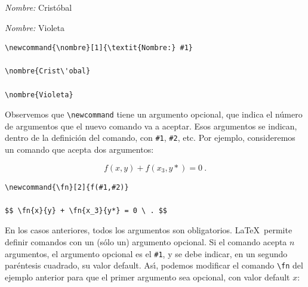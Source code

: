 {\vspace{.3cm}
{\small
\begin{minipage}[t]{5cm}
\newcommand{\nombre}[1]{\textit{Nombre:} #1}
\nombre{Crist\'obal}

\nombre{Violeta}
\end{minipage}
\hspace{1.5cm}
\begin{minipage}[t]{5cm}
\begin{verbatim}
\newcommand{\nombre}[1]{\textit{Nombre:} #1}

\nombre{Crist\'obal}

\nombre{Violeta}
\end{verbatim}
\end{minipage}
}
\vspace{.3cm}

Observemos que \verb+\newcommand+ tiene un argumento opcional, que
indica el n\'umero de argumentos que el nuevo comando va a
aceptar. Esos argumentos se indican, dentro de la definici\'on del
comando, con \verb+#1+, \verb+#2+, etc. Por ejemplo, consideremos un 
comando que acepta dos argumentos:

\vspace{.3cm}
{\small
\begin{minipage}[t]{5cm}
\newcommand{\fn}[2]{f(#1,#2)}

$$ \fn{x}{y} + \fn{x_3}{y*} = 0 \ . $$
\end{minipage}
\hspace{1.5cm}
\begin{minipage}[t]{5cm}
\begin{verbatim}
\newcommand{\fn}[2]{f(#1,#2)}

$$ \fn{x}{y} + \fn{x_3}{y*} = 0 \ . $$
\end{verbatim}
\end{minipage}
}
\vspace{.3cm}

En los casos anteriores, todos los argumentos son obligatorios. \LaTeX\
permite definir comandos con un (s\'olo un) argumento opcional. Si el
comando acepta $n$ argumentos, el argumento opcional es
el \verb+#1+, y se debe indicar, en un segundo par\'entesis cuadrado,
su valor default. As\'{\i}, podemos modificar el comando \verb+\fn+
del ejemplo anterior para que el primer argumento sea opcional, con
valor default $x$:

\vspace{.3cm}
{\small
\begin{minipage}[t]{5cm}
\newcommand{\fn}[2][x]{f(#1,#2)}


\end{minipage}}}
